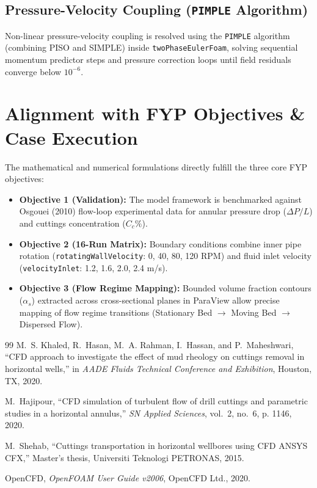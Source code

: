 \documentclass[12pt,a4paper]{article}
\begin{document}
\subsection{Pressure-Velocity Coupling (\texttt{PIMPLE} Algorithm)}
Non-linear pressure-velocity coupling is resolved using the \texttt{PIMPLE} algorithm (combining PISO and SIMPLE) inside \texttt{twoPhaseEulerFoam}, solving sequential momentum predictor steps and pressure correction loops until field residuals converge below $10^{-6}$.

\section{Alignment with FYP Objectives \& Case Execution}
The mathematical and numerical formulations directly fulfill the three core FYP objectives:
\begin{itemize}
    \item \textbf{Objective 1 (Validation):} The model framework is benchmarked against Osgouei (2010) flow-loop experimental data for annular pressure drop ($\Delta P/L$) and cuttings concentration ($C_c\%$).
    \item \textbf{Objective 2 (16-Run Matrix):} Boundary conditions combine inner pipe rotation (\texttt{rotatingWallVelocity}: 0, 40, 80, 120 RPM) and fluid inlet velocity (\texttt{velocityInlet}: 1.2, 1.6, 2.0, 2.4 m/s).
    \item \textbf{Objective 3 (Flow Regime Mapping):} Bounded volume fraction contours ($\alpha_s$) extracted across cross-sectional planes in ParaView allow precise mapping of flow regime transitions (Stationary Bed $\rightarrow$ Moving Bed $\rightarrow$ Dispersed Flow).
\end{itemize}

\begin{thebibliography}{99}
M.~S. Khaled, R.~Hasan, M.~A. Rahman, I.~Hassan, and P.~Maheshwari, ``CFD approach to investigate the effect of mud rheology on cuttings removal in horizontal wells,'' in \emph{AADE Fluids Technical Conference and Exhibition}, Houston, TX, 2020.

M.~Hajipour, ``CFD simulation of turbulent flow of drill cuttings and parametric studies in a horizontal annulus,'' \emph{SN Applied Sciences}, vol.~2, no.~6, p. 1146, 2020.

M.~Shehab, ``Cuttings transportation in horizontal wellbores using CFD ANSYS CFX,'' Master's thesis, Universiti Teknologi PETRONAS, 2015.

OpenCFD, \emph{OpenFOAM User Guide v2006}, OpenCFD Ltd., 2020.
\end{thebibliography}
\end{document}
